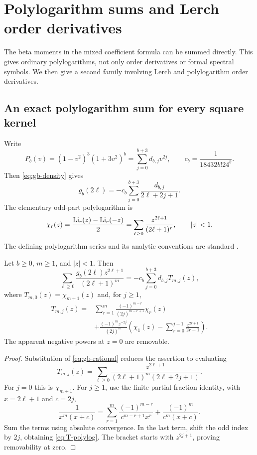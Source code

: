 \section{Polylogarithm sums and Lerch order derivatives}
\label{sec:polylog}

The beta moments in the mixed coefficient formula can be summed directly.
This gives ordinary polylogarithms, not only order derivatives or formal
spectral symbols. We then give a second family involving Lerch and
polylogarithm order derivatives.

\subsection{An exact polylogarithm sum for every square kernel}
Write
\begin{equation}\label{eq:Pbcoeff}
 P_b(v)=(1-v^2)^3(1+3v^2)^b
       =\sum_{j=0}^{b+3}d_{b,j}v^{2j},
 \qquad c_b=\frac1{18432b!24^b}.
\end{equation}
Then \eqref{eq:gb-density} gives
\begin{equation}\label{eq:gb-rational}
 g_b(2\ell)=-c_b\sum_{j=0}^{b+3}\frac{d_{b,j}}{2\ell+2j+1}.
\end{equation}
The elementary odd-part polylogarithm is
\[
 \chi_r(z)=\frac{\operatorname{Li}_r(z)-\operatorname{Li}_r(-z)}2
 =\sum_{\ell\ge0}\frac{z^{2\ell+1}}{(2\ell+1)^r},\qquad |z|<1.
\]
The defining polylogarithm series and its analytic conventions are
standard \cite{DLMF12}.

\begin{theorem}
\label{thm:polylog-sum}
Let $b\ge0$, $m\ge1$, and $|z|<1$. Then
\begin{equation}\label{eq:polylog-sum}
 \sum_{\ell\ge0}\frac{g_b(2\ell)z^{2\ell+1}}{(2\ell+1)^m}
 =-c_b\sum_{j=0}^{b+3}d_{b,j}T_{m,j}(z),
\end{equation}
where $T_{m,0}(z)=\chi_{m+1}(z)$ and, for $j\ge1$,
\begin{equation}\label{eq:T-polylog}
\begin{split}
 T_{m,j}(z)={}&\sum_{r=1}^m
 \frac{(-1)^{m-r}}{(2j)^{m-r+1}}\chi_r(z)\\
 &+\frac{(-1)^m z^{-2j}}{(2j)^m}
 \left(\chi_1(z)-\sum_{r=0}^{j-1}\frac{z^{2r+1}}{2r+1}\right).
\end{split}
\end{equation}
The apparent negative powers at $z=0$ are removable.
\end{theorem}
\begin{proof}
Substitution of \eqref{eq:gb-rational} reduces the assertion to evaluating
\[
 T_{m,j}(z)=\sum_{\ell\ge0}
 \frac{z^{2\ell+1}}{(2\ell+1)^m(2\ell+2j+1)}.
\]
For $j=0$ this is $\chi_{m+1}$. For $j\ge1$, use the finite partial
fraction identity, with $x=2\ell+1$ and $c=2j$,
\begin{equation}\label{eq:partial-fraction}
 \frac1{x^m(x+c)}=
 \sum_{r=1}^m\frac{(-1)^{m-r}}{c^{m-r+1}x^r}
 +\frac{(-1)^m}{c^m(x+c)}.
\end{equation}
Sum the terms using absolute convergence. In the last term, shift the
odd index by $2j$, obtaining \eqref{eq:T-polylog}. The bracket starts
with $z^{2j+1}$, proving removability at zero.
\end{proof}


